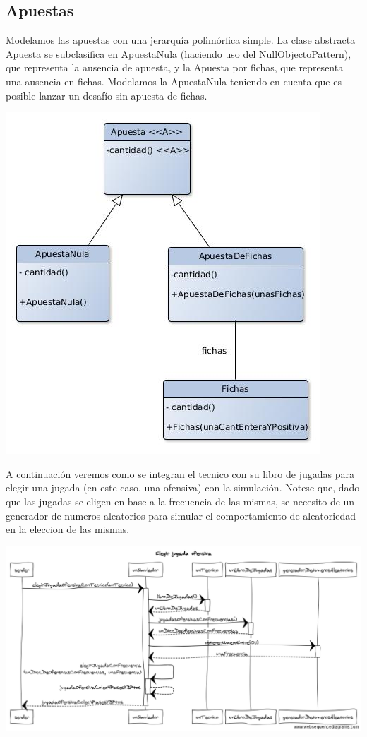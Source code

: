 \subsection{Apuestas}

Modelamos las apuestas con una jerarquía polimórfica simple. La clase abstracta Apuesta se subclasifica en ApuestaNula (haciendo uso del NullObjectoPattern), que representa la ausencia de apuesta, y la Apuesta por fichas, que representa una ausencia en fichas. Modelamos la ApuestaNula teniendo en cuenta que es posible lanzar un desafío sin apuesta de fichas.\\
\begin{center}
\includegraphics[scale=0.4]{diseno/apuestas.jpg}
\end{center}



A continuación veremos como se integran el tecnico con su libro de jugadas para elegir una jugada (en este caso, una ofensiva) con la simulación. Notese que, dado que las jugadas se eligen en base a la frecuencia de las mismas, se necesito de un generador de numeros aleatorios para simular el comportamiento de aleatoriedad en la eleccion de las mismas.
\begin{center}
\includegraphics[scale=0.30]{diseno/Elegir_jugada_ofensiva.png} 
\end{center}


